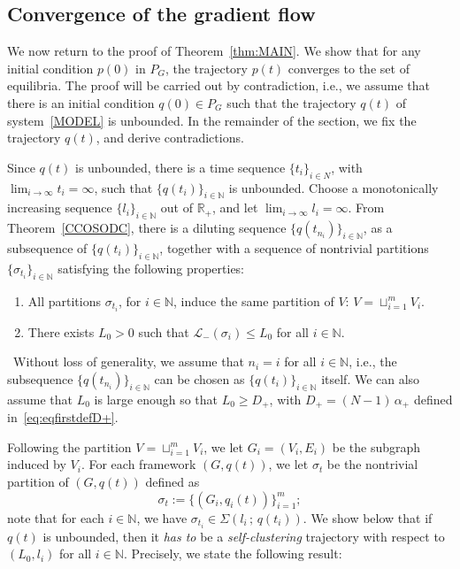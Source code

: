 \documentclass[10pt,twocolumn,twoside]{IEEEtran}
\newcommand{\R}{\mathbb{R}}
\renewcommand{\cal}{\mathcal}
\renewcommand{\(}{\left (}
\renewcommand{\)}{\right )}
\renewcommand{\;}{\,;\,}
\newcommand{\N}{\mathbb{N}}
\begin{document}
\subsection{Convergence of the gradient flow}\label{ssec:sotgf}
We now return to the proof of Theorem~\ref{thm:MAIN}. We show that for any initial condition $p(0)$ in $P_G$, the trajectory $p(t)$ converges to the set of equilibria. 
The proof will be carried out by contradiction, i.e., we assume that there is an initial condition $q(0)\in P_G$ such that the trajectory $q(t)$ of system~\eqref{MODEL} is unbounded. In the remainder of the section, we fix the trajectory $q(t)$, and derive contradictions.  






Since $q(t)$ is unbounded, there is a time sequence $\{t_i\}_{i\in N}$, with $\lim_{i\to \infty} t_i = \infty$, such that $\{q(t_i)\}_{i\in\N}$ is unbounded. Choose a monotonically increasing sequence $\{l_i\}_{i\in \N}$ out of $\R_+$, and let $\lim_{i\to \infty} l_i = \infty$.  
From Theorem~\ref{CCOSODC}, there is a diluting sequence  $\{q(t_{n_i})\}_{i\in \N}$, as a subsequence of $\{q(t_i)\}_{i\in \N}$, together with a sequence of nontrivial partitions $\{\sigma_{t_i}\}_{i\in\N}$ satisfying the following properties:
\begin{enumerate}
\item All partitions $\sigma_{t_i}$, for $i\in \N$, induce the same partition of $V$: 
$
V = \sqcup^m_{i=1} V_i
$.
\item There exists $L_0 > 0$ such that
$
\cal{L}_-(\sigma_i) \le L_0
$ for all $ i\in \N$.
\end{enumerate}  \,
Without loss of generality, we assume that $n_i = i$ for all $i\in\N$, i.e., the subsequence $\{q(t_{n_i})\}_{i\in\N}$ can be chosen as $\{q(t_i)\}_{i\in\N}$ itself. We can also assume that  $L_0$ is large enough so that $L_0 \ge D_+$, with $D_+ = (N - 1) \, \alpha_+$ defined in~\eqref{eq:eqfirstdefD+}.  





Following the partition $V = \sqcup^m_{i=1} V_i$, we let $G_i = (V_i, E_i)$ be the subgraph induced by $V_i$. For each framework $(G,q(t))$, we let $\sigma_t$ be the nontrivial partition of $(G,q(t))$ defined as
\begin{equation}\label{eq:defsigmat}
\sigma_t:= \{(G_i, q_i(t))\}^m_{i = 1};  
\end{equation}
note that for each $i \in \N$, we have  $\sigma_{t_i} \in \Sigma(l_i\; q(t_i))$. 
We show below that if $q(t)$ is unbounded, then it {\it has to} be a {\it self-clustering} trajectory with respect to $(L_0,l_i)$ for all $i\in \N$. 
Precisely, we state the following result:
\end{document}
